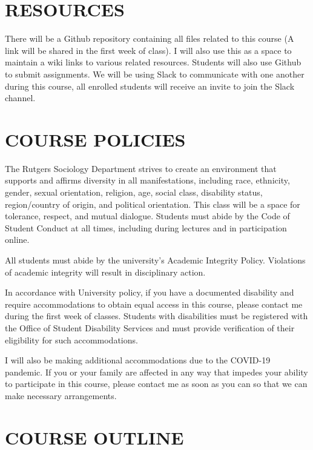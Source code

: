 \documentclass[
  10pt,
]{article}
\begin{document}
\hypertarget{resources}{%
\section{RESOURCES}\label{resources}}

There will be a Github repository containing all files related to this
course (A link will be shared in the first week of class). I will also
use this as a space to maintain a wiki links to various related
resources. Students will also use Github to submit assignments. We will
be using Slack to communicate with one another during this course, all
enrolled students will receive an invite to join the Slack channel.

\hypertarget{course-policies}{%
\section{COURSE POLICIES}\label{course-policies}}

The Rutgers Sociology Department strives to create an environment that
supports and affirms diversity in all manifestations, including race,
ethnicity, gender, sexual orientation, religion, age, social class,
disability status, region/country of origin, and political orientation.
This class will be a space for tolerance, respect, and mutual dialogue.
Students must abide by the Code of Student Conduct at all times,
including during lectures and in participation online.

All students must abide by the university's Academic Integrity Policy.
Violations of academic integrity will result in disciplinary action.

In accordance with University policy, if you have a documented
disability and require accommodations to obtain equal access in this
course, please contact me during the first week of classes. Students
with disabilities must be registered with the Office of Student
Disability Services and must provide verification of their eligibility
for such accommodations.

I will also be making additional accommodations due to the COVID-19
pandemic. If you or your family are affected in any way that impedes
your ability to participate in this course, please contact me as soon as
you can so that we can make necessary arrangements.

\hypertarget{course-outline}{%
\section{COURSE OUTLINE}\label{course-outline}}
\end{document}
